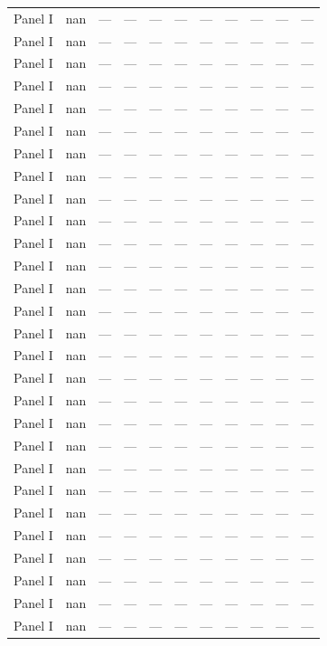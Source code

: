 \begin{longtable}{lllrrrrrrrl}
Panel I & nan & — & — & — & — & — & — & — & — & — \\
Panel I & nan & — & — & — & — & — & — & — & — & — \\
Panel I & nan & — & — & — & — & — & — & — & — & — \\
Panel I & nan & — & — & — & — & — & — & — & — & — \\
Panel I & nan & — & — & — & — & — & — & — & — & — \\
Panel I & nan & — & — & — & — & — & — & — & — & — \\
Panel I & nan & — & — & — & — & — & — & — & — & — \\
Panel I & nan & — & — & — & — & — & — & — & — & — \\
Panel I & nan & — & — & — & — & — & — & — & — & — \\
Panel I & nan & — & — & — & — & — & — & — & — & — \\
Panel I & nan & — & — & — & — & — & — & — & — & — \\
Panel I & nan & — & — & — & — & — & — & — & — & — \\
Panel I & nan & — & — & — & — & — & — & — & — & — \\
Panel I & nan & — & — & — & — & — & — & — & — & — \\
Panel I & nan & — & — & — & — & — & — & — & — & — \\
Panel I & nan & — & — & — & — & — & — & — & — & — \\
Panel I & nan & — & — & — & — & — & — & — & — & — \\
Panel I & nan & — & — & — & — & — & — & — & — & — \\
Panel I & nan & — & — & — & — & — & — & — & — & — \\
Panel I & nan & — & — & — & — & — & — & — & — & — \\
Panel I & nan & — & — & — & — & — & — & — & — & — \\
Panel I & nan & — & — & — & — & — & — & — & — & — \\
Panel I & nan & — & — & — & — & — & — & — & — & — \\
Panel I & nan & — & — & — & — & — & — & — & — & — \\
Panel I & nan & — & — & — & — & — & — & — & — & — \\
Panel I & nan & — & — & — & — & — & — & — & — & — \\
Panel I & nan & — & — & — & — & — & — & — & — & — \\
Panel I & nan & — & — & — & — & — & — & — & — & — \\

\end{longtable}
